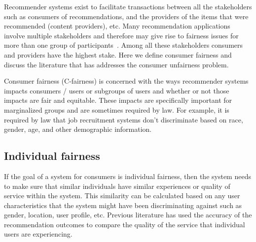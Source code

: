 Recommender systems exist to facilitate transactions between all the stakeholders such as consumers of recommendations, and the providers of the items that were recommended (content providers), etc. Many recommendation applications involve multiple stakeholders and therefore may give rise to fairness issues for more than one group of participants~\cite{burke_multisided_2017}. Among all these stakeholders consumers and providers have the highest stake. 
Here we  define consumer fairness and discuss the literature that has addresses the consumer unfairness problem.

Consumer fairness (C-fairness) is concerned with the ways recommender systems impacts consumers / users or subgroups of users and whether or not those impacts are fair and equitable. These impacts are specifically important for marginalized groups and are sometimes required by law. For example, it is required by law that job recruitment systems don't discriminate based on race, gender, age, and other demographic information. 

    \subsection{Individual fairness}
    If the goal of a system for consumers is individual fairness, then the system needs to make sure that similar individuals have similar experiences or quality of service within the system. This similarity can be calculated based on any user characteristics that the system might have been discriminating against such as gender, location, user profile, etc. Previous literature has used the accuracy of the recommendation outcomes to compare the quality of the service that individual users are experiencing. 
    
